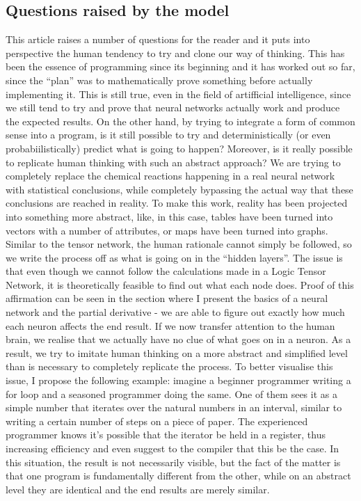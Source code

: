 \documentclass{article}
\begin{document}
\subsection{Questions raised by the model}
This article raises a number of questions for the reader and it puts into perspective the human tendency to try and clone our way of thinking. This has been the essence of programming since its beginning and it has worked out so far, since the ``plan'' was to mathematically prove something before actually implementing it. This is still true, even in the field of artifficial intelligence, since we still tend to try and prove that neural networks actually work and produce the expected results. On the other hand, by trying to integrate a form of common sense into a program, is it still possible to try and deterministically (or even probabiilistically) predict what is going to happen? Moreover, is it really possible to replicate human thinking with such an abstract approach? We are trying to completely replace the chemical reactions happening in a real neural network with statistical conclusions, while completely bypassing the actual way that these conclusions are reached in reality. To make this work, reality has been projected into something more abstract, like, in this case, tables have been turned into vectors with a number of attributes, or maps have been turned into graphs. Similar to the tensor network, the human rationale cannot simply be followed, so we write the process off as what is going on in the ``hidden layers''. The issue is that even though we cannot follow the calculations made in a Logic Tensor Network, it is theoretically feasible to find out what each node does. Proof of this affirmation can be seen in the section where I present the basics of a neural network and the partial derivative - we are able to figure out exactly how much each neuron affects the end result. If we now transfer attention to the human brain, we realise that we actually have no clue of what goes on in a neuron. As a result, we try to imitate human thinking on a more abstract and simplified level than is necessary to completely replicate the process. To better visualise this issue, I propose the following example: imagine a beginner programmer writing a for loop and a seasoned programmer doing the same. One of them sees it as a simple number that iterates over the natural numbers in an interval, similar to writing a certain number of steps on a piece of paper. The experienced programmer knows it's possible that the iterator be held in a register, thus increasing efficiency and even suggest to the compiler that this be the case. In this situation, the result is not necessarily visible, but the fact of the matter is that one program is fundamentally different from the other, while on an abstract level they are identical and the end results are merely similar. 
\end{document}
